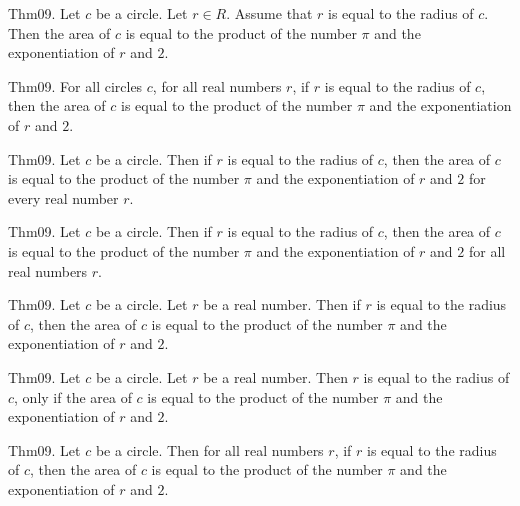 \documentclass{article}
\begin{document}
Thm09. Let $c$ be a circle. Let $r \in R$. Assume that $r$ is equal to the radius of $c$. Then the area of $c$ is equal to the product of the number \(\pi\) and the exponentiation of $r$ and $2$.

Thm09. For all circles $c$, for all real numbers $r$, if $r$ is equal to the radius of $c$, then the area of $c$ is equal to the product of the number \(\pi\) and the exponentiation of $r$ and $2$.

Thm09. Let $c$ be a circle. Then if $r$ is equal to the radius of $c$, then the area of $c$ is equal to the product of the number \(\pi\) and the exponentiation of $r$ and $2$ for every real number $r$.

Thm09. Let $c$ be a circle. Then if $r$ is equal to the radius of $c$, then the area of $c$ is equal to the product of the number \(\pi\) and the exponentiation of $r$ and $2$ for all real numbers $r$.

Thm09. Let $c$ be a circle. Let $r$ be a real number. Then if $r$ is equal to the radius of $c$, then the area of $c$ is equal to the product of the number \(\pi\) and the exponentiation of $r$ and $2$.

Thm09. Let $c$ be a circle. Let $r$ be a real number. Then $r$ is equal to the radius of $c$, only if the area of $c$ is equal to the product of the number \(\pi\) and the exponentiation of $r$ and $2$.

Thm09. Let $c$ be a circle. Then for all real numbers $r$, if $r$ is equal to the radius of $c$, then the area of $c$ is equal to the product of the number \(\pi\) and the exponentiation of $r$ and $2$.
\end{document}
